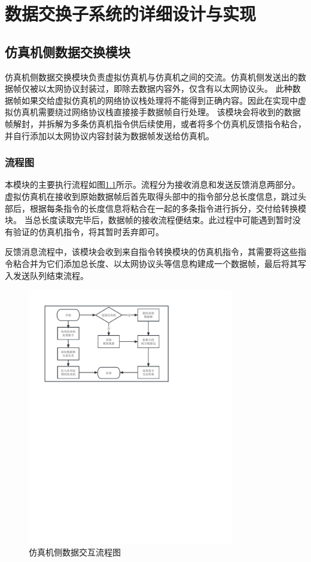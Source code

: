 \chapter{数据交换子系统的详细设计与实现}
\section{仿真机侧数据交换模块}
仿真机侧数据交换模块负责虚拟仿真机与仿真机之间的交流。仿真机侧发送出的数据帧仅被以太网协议封装过，即除去数据内容外，仅含有以太网协议头。
此种数据帧如果交给虚拟仿真机的网络协议栈处理将不能得到正确内容。因此在实现中虚拟仿真机需要绕过网络协议栈直接接手数据帧自行处理。
该模块会将收到的数据帧解封，并拆解为多条仿真机指令供后续使用，或者将多个仿真机反馈指令粘合，并自行添加以太网协议内容封装为数据帧发送给仿真机。
\subsection{流程图}
\par
本模块的主要执行流程如图\ref{module11}所示。流程分为接收消息和发送反馈消息两部分。虚拟仿真机在接收到原始数据帧后首先取得头部中的指令部分总长度信息，跳过头部后，根据每条指令的长度信息将粘合在一起的多条指令进行拆分，交付给转换模块。
当总长度读取完毕后，数据帧的接收流程便结束。此过程中可能遇到暂时没有验证的仿真机指令，将其暂时丢弃即可。
\par
反馈消息流程中，该模块会收到来自指令转换模块的仿真机指令，其需要将这些指令粘合并为它们添加总长度、以太网协议头等信息构建成一个数据帧，最后将其写入发送队列结束流程。
\clearpage
\begin{figure}[h!]
    \begin{center}
        \includegraphics[width=0.8\textwidth]{pictures/flowchart1.pdf}
        \caption{仿真机侧数据交互流程图}
        \label{module11}
    \end{center}
\end{figure}
